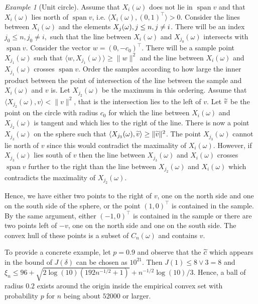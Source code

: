 \documentclass[AHL,Unicode,longabstracts,published]{cedram}
\theoremstyle{remark}
\newtheorem{examl}{Example}
\DeclareMathOperator{\spn}{span}
\let\oldtilde\tilde
\renewcommand*{\tilde}[1]{\mathchoice{\widetilde{#1}}{\widetilde{#1}}{\oldtilde{#1}}{\oldtilde{#1}}}
\begin{document}
\begin{examl}[{Unit circle}]
Assume that $X_i(\omega)$ does not lie in $\spn v$ and that $X_i(\omega)$ lies north of $\spn v$, i.e. $\langle X_i(\omega), (0,1)^\top \rangle > 0$. Consider the lines between $X_i(\omega)$ and the elements $X_j(\omega),\linebreak j \leq n, j\not = i$. There will be an index $j_0 \leq n, j_0 \not = i,$ such that the line between $X_i(\omega)$ and $X_{j_0}(\omega)$ intersects with $\spn v$. Consider the vector $w=(0,-c_0)^\top$. There will be a sample point $X_{j_1}(\omega)$ such that $\langle w,X_{j_1}(\omega) \rangle \geq \|w\|^2$ and the line between $X_i(\omega)$ and $X_{j_1}(\omega)$ crosses $\spn v$. Order the samples according to how large the inner product between the point of intersection of the line between the sample and $X_i(\omega)$ and $v$ is. Let $X_{j_2}(\omega)$ be the maximum in this ordering. Assume that $\langle X_{j_2}(\omega), v \rangle < \|v\|^2$, that is the intersection lies to the left of $v$. Let $\tilde v$ be the point on the circle with radius $c_0$ for which the line between $X_i(\omega)$ and $X_{j_2}(\omega)$ is tangent and which lies to the right of the line. There is now a point $X_{j_3}(\omega)$ on the sphere such that $\langle X_{j_3}(\omega), \tilde v \rangle \geq \|\tilde v\|^2$. The point $X_{j_3}(\omega)$ cannot lie north of $v$ since this would contradict the maximality of $X_i(\omega)$. However, if $X_{j_3}(\omega)$ lies south of $v$ then the line between $X_{j_3}(\omega)$ and $X_i(\omega)$ crosses $\spn v$ further to the right than the line between $X_{j_2}(\omega)$ and $X_i(\omega)$ which contradicts the maximality of $X_{j_2}(\omega)$.

Hence, we have either two points to the right of $v$, one on the north side and one on the south side of the sphere, or the point $(1,0)^\top$ is contained in the sample. By the same argument, either $(-1,0)^\top$ is contained in the sample or there are two points left of $-v$, one on the north side and one on the south side. The convex hull of these points is a subset of $C_n(\omega)$ and contains $v$.

To provide a concrete example, let $p=0.9$ and observe that the $\tilde c$ which appears in the bound of $J(\delta)$ can be chosen as $10^{21}$. Then $J(1) \leq 8 \vee 3 = 8$ and\linebreak $\xi_n \leq 96 + \sqrt{2\log(10)(192 n^{-1/2} +1)} + n^{-1/2}\log(10)/3$. Hence, a ball of radius $0.2$ exists around the origin inside the empirical convex set with probability $p$ for $n$ being about $52000$ or larger.



\end{examl}
\end{document}
